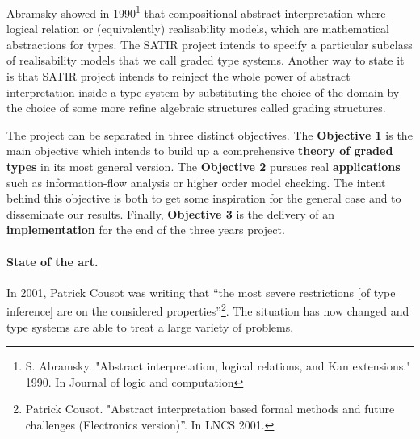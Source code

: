 \documentclass{article}[11pt]
\begin{document}
Abramsky showed in 1990\footnote{S. Abramsky. "Abstract interpretation, logical relations, and Kan extensions." 1990. In Journal of logic and computation} that compositional abstract interpretation where logical relation or (equivalently) realisability models, which are mathematical abstractions for types. The SATIR project intends to specify a particular subclass of realisability models that we call graded type systems. Another way to state it is that SATIR project intends to reinject the whole power of abstract interpretation inside a type system by substituting the choice of the domain by the choice of some more refine algebraic structures called grading structures.

The project can be separated in three distinct objectives. The {\bf Objective 1} is the main objective which intends to build up a comprehensive {\bf theory of graded types} in its most general version. The {\bf Objective 2} pursues real {\bf applications} such as information-flow analysis or higher order model checking. %
The intent behind this objective is both to get some inspiration for the general case and to disseminate our results. Finally, {\bf Objective 3} is the delivery of an {\bf implementation} for the end of the three years project.


\paragraph{State of the art.}


In 2001, Patrick Cousot was writing that ``the most severe restrictions [of type inference] are on the considered properties''\footnote{Patrick Cousot. "Abstract interpretation based formal methods and future challenges (Electronics version)''. In LNCS 2001.}. The situation has now changed and type systems are able to treat a large variety of problems.
\end{document}
